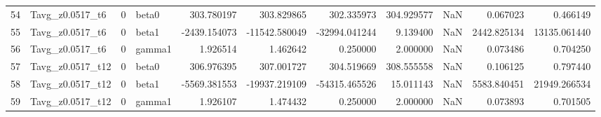 \begin{tabular}{llrlrrrrrrr}
54 &   Tavg_z0.0517_t6 &       0 &     beta0 &    303.780197 &    303.829865 &    302.335973 &   304.929577 &      NaN &      0.067023 &      0.466149 \\
55 &   Tavg_z0.0517_t6 &       0 &     beta1 &  -2439.154073 & -11542.580049 & -32994.041244 &     9.139400 &      NaN &   2442.825134 &  13135.061440 \\
56 &   Tavg_z0.0517_t6 &       0 &    gamma1 &      1.926514 &      1.462642 &      0.250000 &     2.000000 &      NaN &      0.073486 &      0.704250 \\
57 &  Tavg_z0.0517_t12 &       0 &     beta0 &    306.976395 &    307.001727 &    304.519669 &   308.555558 &      NaN &      0.106125 &      0.797440 \\
58 &  Tavg_z0.0517_t12 &       0 &     beta1 &  -5569.381553 & -19937.219109 & -54315.465526 &    15.011143 &      NaN &   5583.840451 &  21949.266534 \\
59 &  Tavg_z0.0517_t12 &       0 &    gamma1 &      1.926107 &      1.474432 &      0.250000 &     2.000000 &      NaN &      0.073893 &      0.701505 \\
\bottomrule
\end{tabular}
